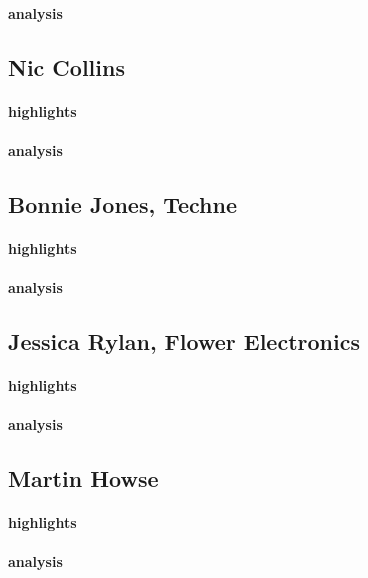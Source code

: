 \paragraph{analysis}

\subsection{Nic Collins}



\paragraph{highlights}
\paragraph{analysis}

\subsection{Bonnie Jones, Techne}
\paragraph{highlights}
\paragraph{analysis}

\subsection{Jessica Rylan, Flower Electronics}
\paragraph{highlights}
\paragraph{analysis}

\subsection{Martin Howse}
\paragraph{highlights}
\paragraph{analysis}

